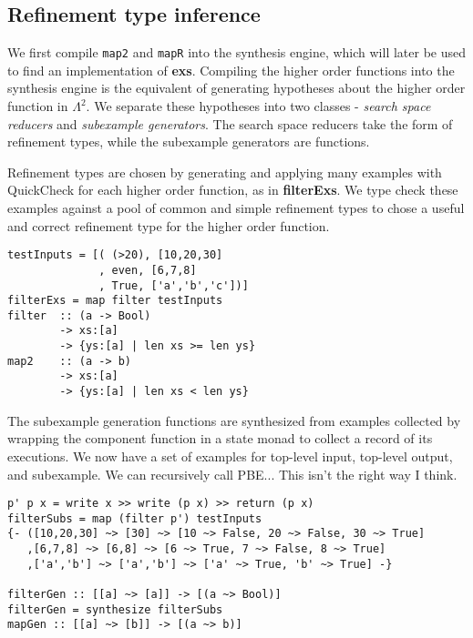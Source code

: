 \subsection{Refinement type inference}
We first compile \texttt{map2} and \texttt{mapR} into the synthesis engine, which will later be used to find an implementation of \textbf{exs}.
Compiling the higher order functions into the synthesis engine is the equivalent of generating hypotheses about the higher order function in $\Lambda^2$.
We separate these hypotheses into two classes - \textit{search space reducers} and \textit{subexample generators}.
The search space reducers take the form of refinement types, while the subexample generators are functions.

Refinement types are chosen by generating and applying many examples with QuickCheck for each higher order function, as in \textbf{filterExs}.
We type check these examples against a pool of common and simple refinement types to chose a useful and correct refinement type for the higher order function.

\begin{verbatim}
testInputs = [( (>20), [10,20,30]
              , even, [6,7,8]
              , True, ['a','b','c'])]
filterExs = map filter testInputs
filter  :: (a -> Bool)
        -> xs:[a]
        -> {ys:[a] | len xs >= len ys}
map2    :: (a -> b)
        -> xs:[a]
        -> {ys:[a] | len xs < len ys}
\end{verbatim}

The subexample generation functions are synthesized from examples collected by wrapping the component function in a state monad to collect a record of its executions.
We now have a set of examples for top-level input, top-level output, and subexample.
We can recursively call PBE... This isn't the right way I think.


\begin{verbatim}
p' p x = write x >> write (p x) >> return (p x)
filterSubs = map (filter p') testInputs
{- ([10,20,30] ~> [30] ~> [10 ~> False, 20 ~> False, 30 ~> True]
   ,[6,7,8] ~> [6,8] ~> [6 ~> True, 7 ~> False, 8 ~> True]
   ,['a','b'] ~> ['a','b'] ~> ['a' ~> True, 'b' ~> True] -}
   
filterGen :: [[a] ~> [a]] -> [(a ~> Bool)]
filterGen = synthesize filterSubs
mapGen :: [[a] ~> [b]] -> [(a ~> b)]
\end{verbatim}
